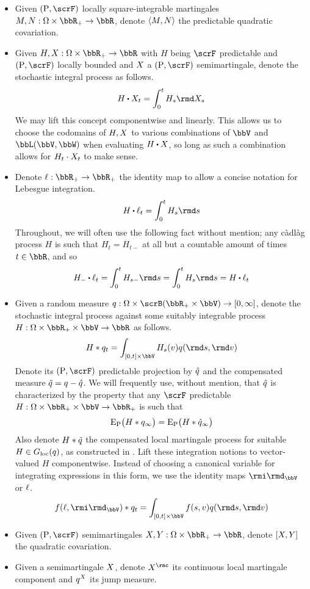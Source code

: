 \begin{itemize}
  \item
    Given $(\Prb,\scrF)$ locally square-integrable martingales $M, N: \Omega \times \bbR_+ \rightarrow \bbR$, denote ${\langle M , N \rangle}$ the predictable quadratic covariation.
  \item
    Given $H,\X: \Omega \times \bbR_+ \rightarrow \bbR$ with $H$ being $\scrF$ predictable and $(\Prb, \scrF)$ locally bounded and $X$ a $(\Prb, \scrF)$ semimartingale, denote the stochastic integral process as follows.
    \[
      H\shortInt \X_t = \int_0^t H_s \rmd\X_s
    \]
    We may lift this concept componentwise and linearly.
    This allows us to choose the codomains of $H, X$ to various combinations of $\vecSpace$ and $\bbL(\vecSpace, \bbW)$ when evaluating $H \shortInt \X$, so long as such a combination allows for $H_t \cdot X_t$ to make sense.
  \item
    Denote $\leb: \bbR_+ \rightarrow \bbR_+$ the identity map to allow a concise notation for Lebesgue integration.
    \[
      H \shortInt \leb_t = \int_0^t H_s \rmd s
    \]
    Throughout, we will often use the following fact without mention; any c\`adl\`ag process $H$ is such that $H_t=H_{t-}$ at all but a countable amount of times $t \in \bbR$, and so 
    \[
      H_- \shortInt \leb_t = \int_0^t H_{s-} \rmd s = \int_0^t H_s \rmd s = H \shortInt \leb_t
    \]
  \item
    Given a random measure $\jumpMeas: \Omega \times \scrB(\bbR_+ \times \vecSpace) \rightarrow [0,\infty]$, denote the stochastic integral process against some suitably integrable process $H: \Omega \times \bbR_+ \times \vecSpace \rightarrow \bbR$ as follows.
    \[
      H \ast \jumpMeas_t = \int_{[0,t] \times \vecSpace} H_s(\markVar) \jumpMeas(\rmd s, \rmd\markVar)
    \]
    Denote its $(\Prb, \scrF)$ predictable projection by $\hat{q}$ and the compensated measure $\tilde{q} = q - \hat{q}$.
    We will frequently use, without mention, that $\hat{q}$ is characterized by the property that any $\scrF$ predictable $H: \Omega \times \bbR_+ \times \vecSpace \rightarrow \bbR_+$ is such that
    \[
      {\operatorname{E}}_{\operatorname{P}}\big( H \ast q_\infty \big)
      = {\operatorname{E}}_{\operatorname{P}}\big( H \ast \hat{q}_\infty \big)
    \]
    Also denote $H \ast \tilde{q}$ the compensated local martingale process for suitable $H \in G_{\operatorname{loc}}(q)$, as constructed in \cite[Definition II.1.27]{jacod2003}.
    Lift these integration notions to vector-valued $H$ componentwise.
    Instead of choosing a canonical variable for integrating expressions in this form, we use the identity maps $\id_\vecSpace$ or $\ell$.
    \[
      f(\leb, \id_\vecSpace) \ast \jumpMeas_t = \int_{[0,t] \times \vecSpace} f(s, \markVar) \jumpMeas(\rmd s, \rmd\markVar)
    \]
  \item
    Given $(\Prb, \scrF)$ semimartingales $\X, Y: \Omega \times \bbR_+ \rightarrow \bbR$, denote $[X,Y]$ the quadratic covariation.
  \item
    Given a semimartingale $X$, denote $\X^\rmc$ its continuous local martingale component and $q^X$ its jump measure.
\end{itemize}
